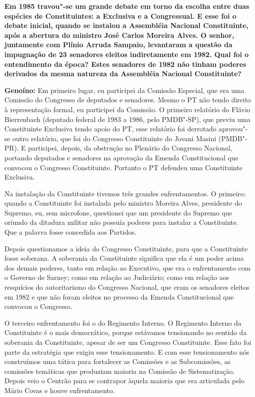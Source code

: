 \textbf{Em 1985 travou"-se um grande debate em torno da escolha entre
duas espécies de Constituintes: a Exclusiva e a Congressual. E esse foi
o debate inicial, quando se instalou a Assembléia Nacional Constituinte,
após a abertura do ministro José Carlos Moreira Alves. O senhor,
juntamente com Plínio Arruda Sampaio, levantaram a questão da impugnação
de 23 senadores eleitos indiretamente em 1982. Qual foi o entendimento
da época? Estes senadores de 1982 não tinham poderes derivados da mesma
natureza da Assembléia Nacional Constituinte?}

\textbf{Genoíno:} Em primeiro lugar, eu participei da Comissão Especial,
que era uma Comissão do Congresso de deputados e senadores. Mesmo o PT
não tendo direito à representação formal, eu participei da Comissão. O
primeiro relatório do Flávio Bierrenbach (deputado federal de 1983 a
1986, pelo PMDB"-SP), que previu uma Constituinte Exclusiva tendo apoio
do PT, esse relatório foi derrotado aprovou"-se outro relatório, que foi
do Congresso Constituinte do Jovani Masini (PMDB"-PR). E participei,
depois, da obstrução no Plenário do Congresso Nacional, portando
deputados e senadores na aprovação da Emenda Constitucional que convocou
o Congresso Constituinte. Portanto o PT defendeu uma Constituinte
Exclusiva.

Na instalação da Constituinte tivemos três grandes enfrentamentos. O
primeiro: quando a Constituinte foi instalada pelo ministro Moreira
Alves, presidente do Supremo, eu, sem microfone, questionei que um
presidente do Supremo que oriundo da ditadura militar não possuía
poderes para instalar a Constituinte. Que a palavra fosse concedida aos
Partidos.

Depois questionamos a ideia do Congresso Constituinte, para que a
Constituinte fosse soberana. A soberania da Constituinte significa que
ela é um poder acima dos demais poderes, tanto em relação ao Executivo,
que era o enfrentamento com o Governo de Sarney; como em relação ao
Judiciário; como em relação aos resquícios do autoritarismo do Congresso
Nacional, que eram os senadores eleitos em 1982 e que não foram eleitos
no processo da Emenda Constitucional que convocou o Congresso.

O terceiro enfrentamento foi o do Regimento Interno. O Regimento Interno
da Constituinte é o mais democrático, porque estávamos tensionando no
sentido da soberania da Constituinte, apesar de ser um Congresso
Constituinte. Esse fato foi parte da estratégia que exigiu esse
tensionamento. E com esse tensionamento nós construímos uma tática para
fortalecer as Comissões e as Subcomissões, as comissões temáticas que
produziam maioria na Comissão de Sistematização. Depois veio o Centrão
para se contrapor àquela maioria que era articulada pelo Mário Covas e
houve enfrentamento.

